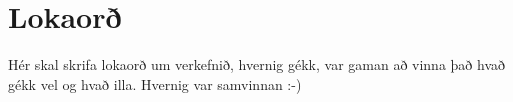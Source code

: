 \section{Lokaorð}
Hér skal skrifa lokaorð um verkefnið, hvernig gékk, var gaman að vinna það hvað gékk vel og hvað illa. Hvernig var samvinnan :-) 